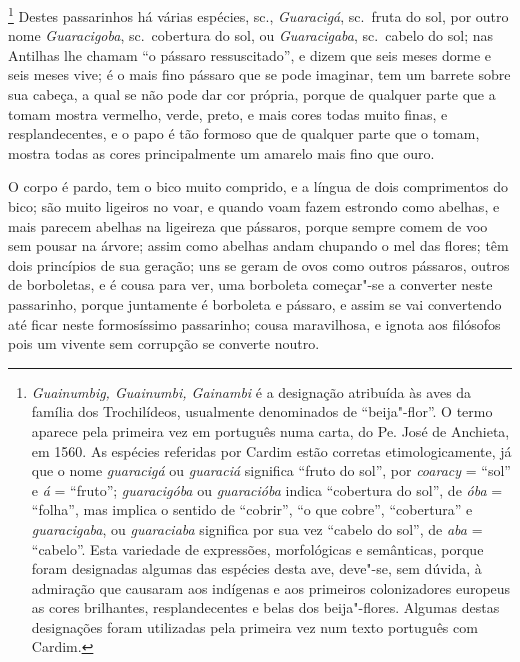 \footnote{ \textit{Guainumbig, Guainumbi,
Gainambi} é a designação atribuída às aves da família dos
Trochilídeos, usualmente denominados de ``beija"-flor''. O termo aparece
pela primeira vez em português numa carta, do Pe. José de
Anchieta, em 1560. As espécies referidas por Cardim estão corretas
etimologicamente, já que o nome \textit{guaracigá} ou \textit{guaraciá}
significa ``fruto do sol'', por \textit{coaracy} = ``sol'' e
\textit{á} = ``fruto''; \textit{guaracigóba} ou \textit{guaracióba}
indica ``cobertura do sol'', de \textit{óba} = ``folha'', mas
implica o sentido de ``cobrir'', ``o que cobre'', ``cobertura'' e
\textit{guaracigaba}, ou \textit{guaraciaba} significa por sua vez
``cabelo do sol'', de \textit{aba} = ``cabelo''. Esta variedade de
expressões, morfológicas e semânticas, porque foram designadas algumas
das espécies desta ave, deve"-se, sem dúvida, à admiração que causaram
aos indígenas e aos primeiros colonizadores europeus as cores
brilhantes, resplandecentes e belas dos beija"-flores. Algumas destas
designações foram utilizadas pela primeira vez num texto português com
Cardim.} Destes passarinhos há várias espécies, sc.,
\textit{Guaracigá}, sc.~fruta do sol, por outro nome
\textit{Guaracigoba}, sc.~cobertura do sol, ou \textit{Guaracigaba}, 
sc.~cabelo do sol; nas Antilhas lhe chamam ``o pássaro ressuscitado'', e
dizem que seis meses dorme e seis meses vive; é o mais fino pássaro que
se pode imaginar, tem um barrete sobre sua cabeça, a qual se não pode
dar cor própria, porque de qualquer parte que a tomam mostra vermelho,
verde, preto, e mais cores todas muito finas, e resplandecentes, e o
papo é tão formoso que de qualquer parte que o tomam, mostra todas as
cores principalmente um amarelo mais fino que ouro.

 O corpo é pardo, tem o bico muito comprido, e a língua de dois
comprimentos do bico; são muito ligeiros no voar, e quando voam fazem
estrondo como abelhas, e mais parecem abelhas na ligeireza que
pássaros, porque sempre comem de voo sem pousar na árvore; assim como
abelhas andam chupando o mel das flores; têm dois princípios de sua
geração; uns se geram de ovos como outros pássaros, outros de
borboletas, e é cousa para ver, uma borboleta começar"-se a converter
neste passarinho, porque juntamente é borboleta e pássaro, e assim se
vai convertendo até ficar neste formosíssimo passarinho; cousa
maravilhosa, e ignota aos filósofos pois um vivente sem corrupção se
converte noutro.

